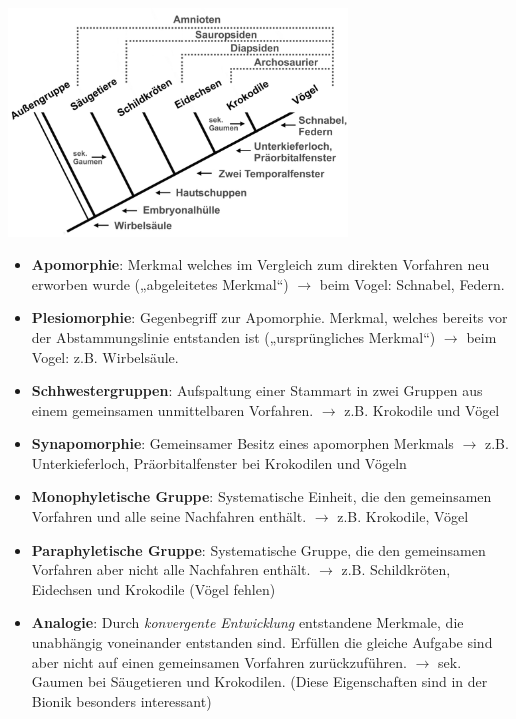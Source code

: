\begin{center}
		\includegraphics[width=9cm]{lec1/figures/phylogenetische_systematik.png}
\end{center}
\begin{center}
	\begin{itemize}
		\item \textbf{Apomorphie}: Merkmal welches im Vergleich zum direkten Vorfahren neu erworben wurde („abgeleitetes Merkmal“) $\rightarrow$ beim Vogel: Schnabel, Federn.
		\item \textbf{Plesiomorphie}: Gegenbegriff zur Apomorphie. Merkmal, welches bereits vor der Abstammungslinie entstanden ist („ursprüngliches Merkmal“) $\rightarrow$ beim Vogel: z.B. Wirbelsäule.
		\item \textbf{Schhwestergruppen}: Aufspaltung einer Stammart in zwei Gruppen aus einem gemeinsamen unmittelbaren Vorfahren. $\rightarrow$ z.B. Krokodile und Vögel
		\item \textbf{Synapomorphie}: Gemeinsamer Besitz eines apomorphen Merkmals $\rightarrow$ z.B. Unterkieferloch, Präorbitalfenster bei Krokodilen und Vögeln
		\item \textbf{Monophyletische Gruppe}: Systematische Einheit, die den gemeinsamen Vorfahren und alle seine Nachfahren enthält. $\rightarrow$ z.B. Krokodile, Vögel
		\item \textbf{Paraphyletische Gruppe}: Systematische Gruppe, die den gemeinsamen Vorfahren aber nicht alle Nachfahren enthält. $\rightarrow$ z.B. Schildkröten, Eidechsen und Krokodile (Vögel fehlen)
		\item \textbf{Analogie}: Durch \textit{konvergente Entwicklung} entstandene Merkmale, die unabhängig voneinander entstanden sind. Erfüllen die gleiche Aufgabe sind aber nicht auf einen gemeinsamen Vorfahren zurückzuführen. $\rightarrow$ sek. Gaumen bei Säugetieren und Krokodilen. (Diese Eigenschaften sind in der Bionik besonders interessant)
	\end{itemize}
\end{center}

